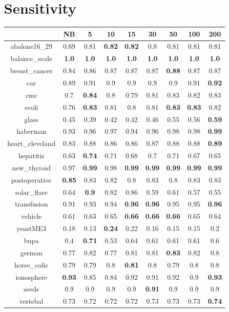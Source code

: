 \documentclass{article}%
\begin{document}
%
\section*{Sensitivity}%
\begin{tabular}{c|cccccccc}%
\hline%
&NB&5&10&15&30&50&100&200\\%
\hline%
abalone16\_29&0.69&0.81&\textbf{0.82}&\textbf{0.82}&0.8&0.81&0.81&0.81\\%
\hline%
balance\_scale&\textbf{1.0}&\textbf{1.0}&\textbf{1.0}&\textbf{1.0}&\textbf{1.0}&\textbf{1.0}&\textbf{1.0}&\textbf{1.0}\\%
\hline%
breast\_cancer&0.84&0.86&0.87&0.87&0.87&\textbf{0.88}&0.87&0.87\\%
\hline%
car&0.89&0.91&0.9&0.9&0.9&0.9&0.91&\textbf{0.92}\\%
\hline%
cmc&0.7&\textbf{0.84}&0.8&0.79&0.81&0.83&0.82&0.83\\%
\hline%
ecoli&0.76&\textbf{0.83}&0.81&0.8&0.81&\textbf{0.83}&\textbf{0.83}&0.82\\%
\hline%
glass&0.45&0.39&0.42&0.42&0.46&0.55&0.56&\textbf{0.59}\\%
\hline%
haberman&0.93&0.96&0.97&0.94&0.96&0.98&0.98&\textbf{0.99}\\%
\hline%
heart\_cleveland&0.83&0.88&0.86&0.86&0.87&0.88&0.88&\textbf{0.89}\\%
\hline%
hepatitis&0.63&\textbf{0.74}&0.71&0.68&0.7&0.71&0.67&0.65\\%
\hline%
new\_thyroid&0.97&\textbf{0.99}&0.98&\textbf{0.99}&\textbf{0.99}&\textbf{0.99}&\textbf{0.99}&\textbf{0.99}\\%
\hline%
postoperative&\textbf{0.85}&0.83&0.82&0.8&0.83&0.8&0.83&0.83\\%
\hline%
solar\_flare&0.64&\textbf{0.9}&0.82&0.86&0.59&0.61&0.57&0.55\\%
\hline%
transfusion&0.91&0.93&0.94&\textbf{0.96}&\textbf{0.96}&0.95&0.95&\textbf{0.96}\\%
\hline%
vehicle&0.61&0.63&0.65&\textbf{0.66}&\textbf{0.66}&\textbf{0.66}&0.65&0.64\\%
\hline%
yeastME3&0.18&0.13&\textbf{0.24}&0.22&0.16&0.15&0.15&0.2\\%
\hline%
bupa&0.4&\textbf{0.71}&0.53&0.64&0.61&0.61&0.61&0.6\\%
\hline%
german&0.77&0.82&0.77&0.81&0.81&\textbf{0.83}&0.82&0.8\\%
\hline%
horse\_colic&0.79&0.79&0.8&\textbf{0.81}&0.8&0.79&0.8&0.8\\%
\hline%
ionosphere&\textbf{0.93}&0.85&0.84&0.92&0.91&0.92&0.9&\textbf{0.93}\\%
\hline%
seeds&0.9&0.9&0.9&0.9&\textbf{0.91}&0.9&0.9&0.9\\%
\hline%
vertebal&0.73&0.72&0.72&0.72&0.73&0.73&0.73&\textbf{0.74}\\%
\hline%
\end{tabular}
\end{document}
